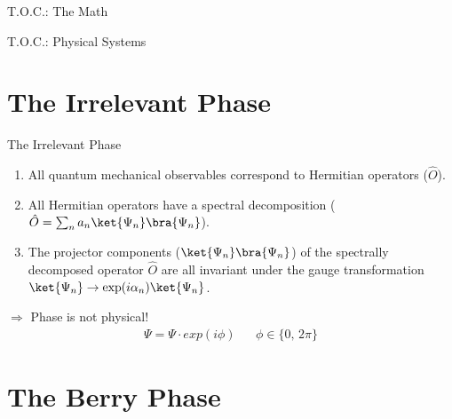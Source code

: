 \documentclass[9pt]{beamer}
\begin{document}
%

\begin{frame}{T.O.C.: The Math}
  \tableofcontents[sections={1-3}]
\end{frame}

\begin{frame}{T.O.C.: Physical Systems}
  \tableofcontents[sections={4-6}]
\end{frame}


\section{The Irrelevant Phase}
\begin{frame}{The Irrelevant Phase}
  
  \begin {enumerate}
    \item All quantum mechanical observables correspond to Hermitian operators 
          ($\hat{O}$).
    \item All Hermitian operators have a spectral decomposition
          ($\hat{O} = \sum_{n} a_{n} \ket{\Psi_{n}}\bra{\Psi_{n}}$).
        \item The projector components ($\ket{\Psi_{n}}\bra{\Psi_{n}}$) of the 
              spectrally decomposed operator $\hat{O}$ are all invariant under 
              the gauge transformation 
              $\ket{\Psi_{n}} \rightarrow \exp(i\alpha_{n}) \ket{\Psi_{n}}$.
  \end{enumerate}

  \vspace{2ex}

  $\Rightarrow$ Phase is not physical!
  \begin{align*}
    \Psi = \Psi \cdot exp(i\phi) && \phi \in \{0, \, 2\pi\}
  \end{align*}
  
\end{frame}

\section{The Berry Phase}
\end{document}

